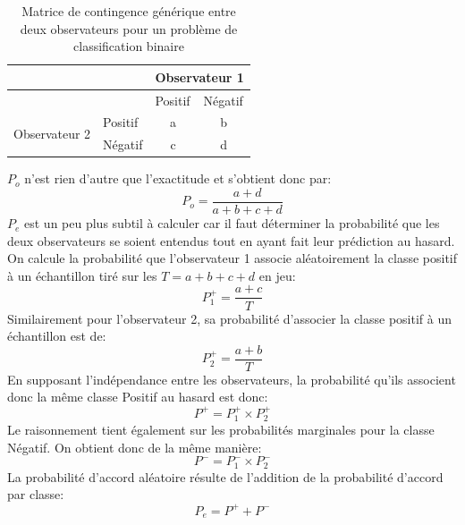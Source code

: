 \begin{table}[h]
	
	\centering
	\caption{Matrice de contingence générique entre deux observateurs pour un problème de classification binaire}
	\label{tab:matContigence}
	\begin{tabular}{@{}llcc@{}}
		\toprule
		&           & \multicolumn{2}{c}{Observateur 1}                             \\ \midrule
		&           & \multicolumn{1}{l}{Positif} & \multicolumn{1}{l}{Négatif} \\ \midrule
		\multirow{2}{*}{Observateur 2} & Positif & a                             & b                              \\
		& Négatif & c                             & d                              \\ \bottomrule
	\end{tabular}
\end{table}
$P_o$ n'est rien d'autre que l'exactitude et s'obtient donc par:
\begin{equation}
	P_o  =  \frac{a + d}{a+b+c+d}
\end{equation}
$P_e$ est un peu plus subtil à calculer car il faut déterminer la probabilité que les deux observateurs se soient entendus tout en ayant fait leur prédiction au hasard. 
On calcule la probabilité que l'observateur 1 associe aléatoirement la classe \og positif \fg à un échantillon tiré sur les $T=a+b+c+d$ en jeu:
\begin{equation}
	P^+_1 = \frac{a+c}{T}
\end{equation}
Similairement pour l'observateur 2, sa probabilité d'associer la classe positif à un échantillon est de:
\begin{equation}
	P^+_2 = \frac{a+b}{T}
\end{equation}
En supposant l'indépendance entre les observateurs, la probabilité qu'ils associent donc la même classe \og Positif \fg au hasard est donc:
\begin{equation}
	\label{eq:MarginalProbabilitéKappa}
	P^+ = P^+_1 \times P^+_2
\end{equation}
Le raisonnement tient également sur les probabilités marginales pour la classe \og Négatif\fg. On obtient donc de la même manière:
\begin{equation}
	P^- = P^-_1 \times P^-_2
\end{equation}
La probabilité d'accord aléatoire résulte de l'addition de la probabilité d'accord par classe:
\begin{equation}
	\label{eq:SommeProbMarginal}
	P_e = P^+ + P^-
\end{equation}

